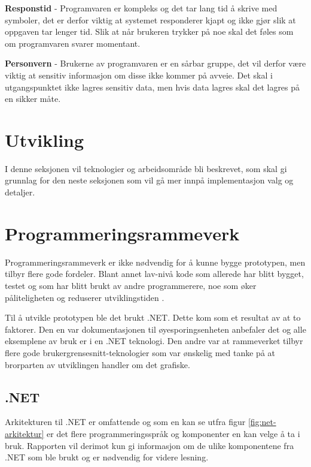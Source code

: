  \textbf{Responstid} -  Programvaren er kompleks og det tar lang tid å skrive med symboler, det er derfor viktig at systemet responderer kjapt og ikke gjør slik at oppgaven tar lenger tid. Slik at når brukeren trykker på noe skal det føles som om programvaren svarer momentant. 

\textbf{Personvern} - Brukerne av programvaren er en sårbar gruppe, det vil derfor være viktig at sensitiv informasjon om disse ikke kommer på avveie. Det skal i utgangspunktet ikke lagres sensitiv data, men hvis data lagres skal det lagres på en sikker måte. 
 
\section{Utvikling} 
 
I denne seksjonen vil teknologier og arbeidsområde bli beskrevet, som skal gi grunnlag for den neste seksjonen som vil gå mer innpå implementasjon valg og detaljer. 
 
 
\section{Programmeringsrammeverk} 

Programmeringsrammeverk er ikke nødvendig for å kunne bygge prototypen, men tilbyr flere gode fordeler. Blant annet lav-nivå kode som allerede har blitt bygget, testet og som har blitt brukt av andre programmerere, noe som øker påliteligheten og reduserer utviklingstiden \cite{Frame7:online}.

Til å utvikle prototypen ble det brukt .NET. Dette kom som et resultat av at
to faktorer. Den en var dokumentasjonen til øyesporingsenheten anbefaler det og alle eksemplene av bruk er i en .NET teknologi. Den andre var at rammeverket tilbyr flere gode brukergrensesnitt-teknologier som var ønskelig med tanke på at brorparten av utviklingen handler om det grafiske.


 
\subsection{.NET}
 
Arkitekturen til .NET er omfattende og som en kan se utfra figur \ref{fig:net-arkitektur} er det flere programmeringsspråk og komponenter en kan velge å ta i bruk. Rapporten vil derimot kun gi informasjon om de ulike komponentene fra .NET som ble brukt og er nødvendig for videre lesning. 
 
